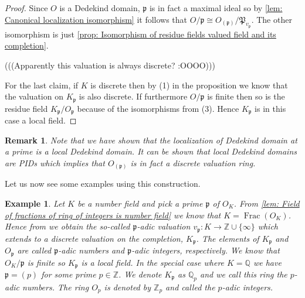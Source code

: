 \documentclass{article}
\DeclareMathOperator{\Frac}{Frac}
\newtheorem{example}{Example}[section]
\newtheorem{remark}{Remark}[section]
\newcommand{\mfrak}[1]{\mathfrak{#1}}
\newcommand{\mbb}[1]{\mathbb{#1}}
\newcommand{\vp}{{v_{\mfrak p}}}
\begin{document}
\begin{proof}
    
    Since $O$ is a Dedekind domain, $\mfrak p$ is in fact a maximal ideal so by \cref{lem: Canonical localization isomorphism} it follows that $O / \mfrak p \cong O_{(\mfrak p)} / \mfrak P_\vp$. The other isomorphism is just \cref{prop: Isomorphism of residue fields valued field and its completion}.
    
    
    (((Apparently this valuation is always discrete? :OOOO)))

    For the last claim, if $K$ is discrete then by (1) in the proposition we know that the valuation on $K_\mfrak p$ is also discrete. If furthermore $O / \mfrak p$ is finite then so is the residue field $K_\mfrak p / O_\mfrak p$ because of the isomorphisms from (3). Hence $K_\mfrak p$ is in this case a local field.
\end{proof}

\begin{remark}
    Note that we have shown that the localization of Dedekind domain at a prime is a local Dedekind domain. It can be shown that local Dedekind domains are PIDs which implies that $O_{(\mfrak p)}$ is in fact a discrete valuation ring.
\end{remark}
    
Let us now see some examples using this construction. 

\begin{example}\label{ex: P-adic numbers}
    Let $K$ be a number field and pick a prime $\mfrak p$ of $O_K$. From \cref{lem: Field of fractions of ring of integers is number field} we know that $K = \Frac(O_K)$. Hence from  we obtain the so-called $\mfrak p$-adic valuation $v_\mfrak p : K \to \mbb Z \cup \{\infty \}$ which extends to a discrete valuation on the completion, $K_\mfrak p$. The elements of $K_\mfrak p$ and $O_\mfrak p$ are called $\mfrak p$-adic numbers and $\mfrak p$-adic integers, respectively. We know that $O_K / \mfrak p$ is finite so $K_\mfrak p$ is a local field. In the special case where $K = \mbb Q$ we have $\mfrak p = (p)$ for some prime $p \in \mbb Z$. We denote $K_\mfrak p$ as $\mbb Q_p$ and we call this ring the $p$-adic numbers. The ring $O_p$ is denoted by $\mbb Z_p$ and called the $p$-adic integers.
\end{example}
\end{document}
